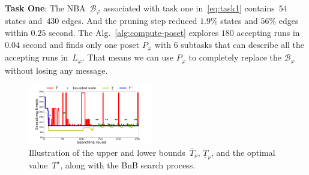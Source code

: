 \textbf{Task One}:
The NBA~$\mathcal{B}_{\varphi}$ associated with task one in~\eqref{eq:task1}
contains~$54$ states and~$430$ edges. And the pruning step reduced $1.9\%$ states
and $56\%$ edges within $0.25$ second. The Alg.~\ref{alg:compute-poset} explores
 $180$ accepting runs in $0.04$ second and finds only one poset $P_{\varphi}$ with $6$ subtasks
that can describe all the accepting runs in~$L_\varphi$.
That means we can use $P_{\varphi}$ to completely replace the $\mathcal{B}_{\varphi}$ without
losing any message.


\begin{figure}[t!]
\centering%
\includegraphics[width = 0.48\textwidth]{figures/simulation/task2/bnb_search3.pdf}
\caption{Illustration of the upper and lower
bounds~$\overline{T}_\nu,\,\underline{T}_\nu$, and the optimal value~$T^\star$,
along with the BnB search process.}
\label{fig:task2-bnb}
\end{figure}

